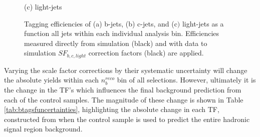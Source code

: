 \begin{figure}[ht]
\begin{minipage}[b]{0.48\linewidth}
\centering (c) light-jets
\end{minipage}
\caption[Tagging efficiencies of (a) b-jets, (b) c-jets, and (c$)$ light-jets determined from all jets within each individual analysis \theht bin. ]{Tagging efficiencies of (a) b-jets, (b) c-jets, and (c$)$ light-jets as a function all jets within each individual analysis \theht bin. Efficiencies measured directly from simulation (black) and with data to simulation $SF_{b,c,light}$ correction factors (black) are applied.}\label{fig:btagefficiency}
\end{figure}



Varying the scale factor corrections by their systematic uncertainty will change the absolute yields within  each $n_{b}^{reco}$ bin of all selections. However, ultimately it is the change in the \ac{TF}'s which influences the final background prediction from each of the control samples. The magnitude of these change is shown in Table \ref{tab:btagsfuncertainties}, highlighting the absolute change in each \ac{TF}, constructed from when the \mupjets control sample is used to predict the entire hadronic signal region background. 

